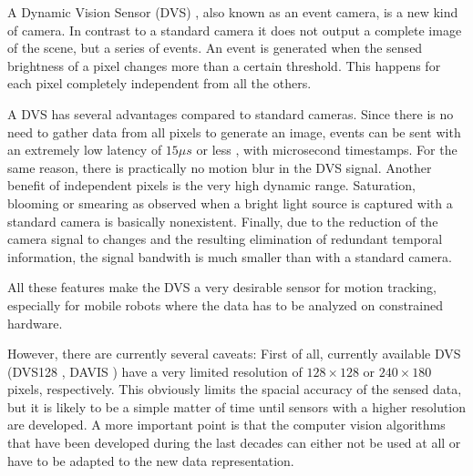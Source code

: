 A Dynamic Vision Sensor (DVS) \cite{lpd08dvs}, also known as an event camera,
is a new kind of camera. In contrast to a standard camera it does not output a
complete image of the scene, but a series of events. An event is generated when
the sensed brightness of a pixel changes more than a certain threshold. This
happens for each pixel completely independent from all the others.

A DVS has several advantages compared to standard cameras. Since there is no
need to gather data from all pixels to generate an image, events can be sent
with an extremely low latency of $15 \mu s$ or less \cite{lpd08dvs, brandli14davis},
with microsecond timestamps.  For the same reason, there is practically no
motion blur in the DVS signal.  Another benefit of independent pixels is the
very high dynamic range.  Saturation, blooming or smearing as observed when a
bright light source is captured with a standard camera is basically
nonexistent. Finally, due to the reduction of the camera signal to changes and
the resulting elimination of redundant temporal information, the signal
bandwith is much smaller than with a standard camera.

All these features make the DVS a very desirable sensor for motion tracking,
especially for mobile robots where the data has to be analyzed on constrained
hardware.

However, there are currently several caveats: First of all, currently available
DVS (DVS128 \cite{lpd08dvs}, DAVIS \cite{brandli14davis}) have a very limited
resolution of $128 \times 128$ or $240 \times 180$ pixels, respectively. This
obviously limits the spacial accuracy of the sensed data, but it is likely to
be a simple matter of time until sensors with a higher resolution are
developed. A more important point is that the computer vision algorithms that
have been developed during the last decades can either not be used at all or
have to be adapted to the new data representation.
